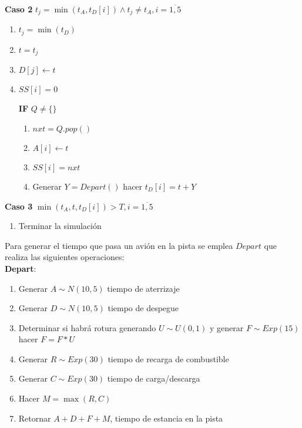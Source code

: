 \documentclass[a4paper,10pt,twocolumn]{article}
\begin{document}
		\textbf{Caso 2} $ t_{j} = \min{( t_{A}, t_{D}[i] )} \wedge t_{j} \neq t_{A}, i = \overline{1,5}$
		
		\begin{enumerate}
			\item[] $t_{j} = \min(t_{D})$
			\item[] $t = t_{j}$
			\item[] $D[j] \leftarrow t$
			\item[] $SS[i] = 0$
			
			\textbf{IF} $Q \neq \{\}$
				\begin{enumerate}
					\item[] $nxt = Q.pop()$
					\item[] $A[i] \leftarrow t$
					\item[] $SS[i] = nxt$
					\item[] Generar $Y = Depart()$ hacer $t_{D}[i] = t + Y$ 
				\end{enumerate} 
		\end{enumerate}
		
		\textbf{Caso 3} $ \min{( t_{A}, t, t_{D}[i] )} > T, i = \overline{1,5}$
		
		\begin{enumerate}
			\item[] Terminar la simulaci\'on 
		\end{enumerate}
		
		Para generar el tiempo que pasa un avi\'on en la pista se emplea $Depart$ que realiza las siguientes operaciones:\\
		
		\textbf{Depart}:
		\begin{enumerate}
			\item[] Generar $A \sim N(10,5)$ tiempo de aterrizaje
			\item[] Generar $D \sim N(10,5)$ tiempo de despegue
			\item[] Determinar si habr\'a rotura generando $U \sim U(0,1)$ y generar $F \sim Exp(15)$ hacer $F = F * U$
			\item[] Generar $R \sim Exp(30)$ tiempo de recarga de combustible
			\item[] Generar $C \sim Exp(30)$ tiempo de carga/descarga
			\item[] Hacer $M = \max{(R, C)}$
			\item[] Retornar $A + D + F + M$, tiempo de estancia en la pista
		\end{enumerate}
		
\end{document}
